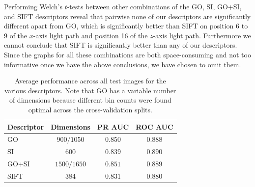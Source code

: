 \documentclass[thesis.tex]{subfiles}
\begin{document}
Performing Welch's $t$-tests between other combinations of the GO, SI, GO+SI, and SIFT descriptors reveal that pairwise none of our descriptors are significantly different apart from GO, which is significantly better than SIFT on position 6 to 9 of the $x$-axis light path and position 16 of the $z$-axis light path. Furthermore we cannot conclude that SIFT is significantly better than any of our descriptors. Since the graphs for all these combinations are both space-consuming and not too informative once we have the above conclusions, we have chosen to omit them. 
%
\begin{table}[tb]
\centering
\begin{tabular}{ l c c c }
\toprule
Descriptor & Dimensions & PR AUC & ROC AUC \\ \midrule
GO & $900/1050$ & $0.850$ & $0.888$ \\ 
SI & $600$ & $0.839$ & $0.890$ \\ 
GO+SI & $1500/1650$ & $0.851$ & $0.889$ \\ 
SIFT & $384$ & $0.831$ & $0.880$ \\ 
\bottomrule
\end{tabular}
\caption{Average performance across all test images for the various descriptors. Note that GO has a variable number of dimensions because different bin counts were found optimal across the cross-validation splits.}
\label{tbl:dtuOverallResults}
\end{table}
%
\end{document}
